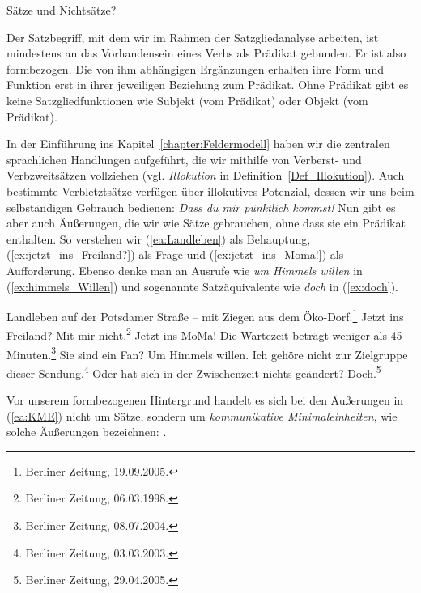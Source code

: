 \begin{Exkurs}{Sätze und Nichtsätze?}\label{Exkurs:Satz_Nichtsatz}

Der Satzbegriff, mit dem wir im Rahmen der Satzgliedanalyse arbeiten, ist mindestens an das Vorhandensein eines Verbs als Prädikat gebunden. Er ist also formbezogen. Die von ihm abhängigen Ergänzungen erhalten ihre Form und Funktion erst in ihrer jeweiligen Beziehung zum Prädikat. Ohne Prädikat gibt es keine Satzgliedfunktionen wie Subjekt (vom Prädikat) oder Objekt (vom Prädikat). 

In der Einführung ins Kapitel~\ref{chapter:Feldermodell} haben wir die zentralen sprachlichen Handlungen aufgeführt, die wir mithilfe von Verberst- und Verbzweitsätzen vollziehen (vgl. \textit{Illokution} in Definition~\ref{Def_Illokution}). Auch bestimmte Verbletztsätze verfügen über illokutives Potenzial, dessen wir uns beim selbständigen Gebrauch bedienen: \textit{Dass du mir pünktlich kommst!} Nun gibt es aber auch Äußerungen, die wir wie Sätze gebrauchen, ohne dass sie ein Prädikat enthalten. So verstehen wir (\ref{ea:Landleben}) als Behauptung, (\ref{ex:jetzt_ins_Freiland?}) als Frage und (\ref{ex:jetzt_ins_Moma!}) als Aufforderung. Ebenso denke man an Ausrufe wie \textit{um Himmels willen} in (\ref{ex:himmels_Willen}) und sogenannte Satzäquivalente wie \textit{doch} in (\ref{ex:doch}).

\ea \label{ea:KME}
\ea \label{ea:Landleben} Landleben auf der Potsdamer Straße – mit Ziegen aus dem Öko-Dorf.\footnote{Berliner Zeitung, 19.09.2005.}
\ex \label{ex:jetzt_ins_Freiland?} Jetzt ins Freiland? Mit mir nicht.\footnote{Berliner Zeitung, 06.03.1998.}
\ex \label{ex:jetzt_ins_Moma!} Jetzt ins MoMa! Die Wartezeit beträgt weniger als 45 Minuten.\footnote{Berliner Zeitung, 08.07.2004.}
\ex \label{ex:himmels_Willen} Sie sind ein Fan? Um Himmels willen. Ich gehöre nicht zur Zielgruppe dieser Sendung.\footnote{Berliner Zeitung, 03.03.2003.}
\ex\label{ex:doch} Oder hat sich in der Zwischenzeit nichts geändert? Doch.\footnote{Berliner Zeitung, 29.04.2005.}
\z 
\z  

Vor unserem formbezogenen Hintergrund handelt es sich bei den Äußerungen in (\ref{ea:KME}) nicht um Sätze, sondern um \textit{kommunikative Minimaleinheiten}, wie \citet[86]{ZifHoffStr1997} solche Äußerungen bezeichnen: . 


\end{Exkurs}
